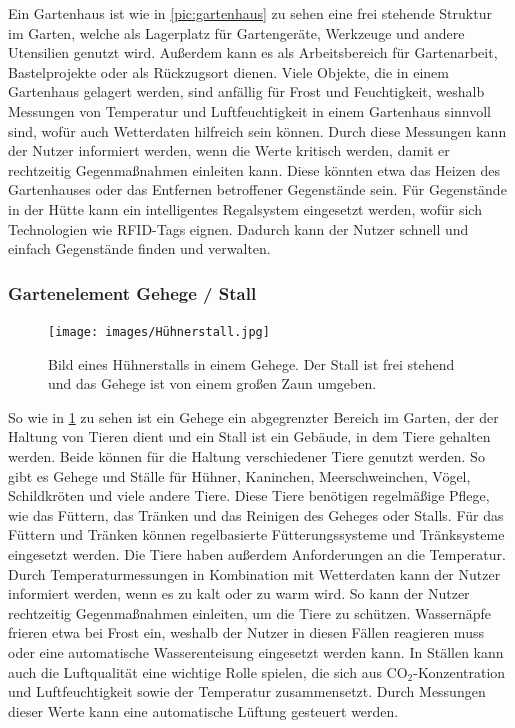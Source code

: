 
Ein Gartenhaus ist wie in \cref{pic:gartenhaus} zu sehen eine frei stehende Struktur im Garten, welche als Lagerplatz für Gartengeräte, Werkzeuge und andere Utensilien genutzt wird.
Außerdem kann es als Arbeitsbereich für Gartenarbeit, Bastelprojekte oder als Rückzugsort dienen.
Viele Objekte, die in einem Gartenhaus gelagert werden, sind anfällig für Frost und Feuchtigkeit, weshalb Messungen von Temperatur und Luftfeuchtigkeit in einem Gartenhaus sinnvoll sind, wofür auch Wetterdaten hilfreich sein können.
Durch diese Messungen kann der Nutzer informiert werden, wenn die Werte kritisch werden, damit er rechtzeitig Gegenmaßnahmen einleiten kann.
Diese könnten etwa das Heizen des Gartenhauses oder das Entfernen betroffener Gegenstände sein.
Für Gegenstände in der Hütte kann ein intelligentes Regalsystem eingesetzt werden, wofür sich Technologien wie RFID-Tags eignen.
Dadurch kann der Nutzer schnell und einfach Gegenstände finden und verwalten.

\subsubsection{Gartenelement Gehege / Stall}
\begin{figure}[!htb]
	\centering
	\texttt{[image: images/Hühnerstall.jpg]}
	\caption[Bild eines Hühnerstalls in einem Gehege.]{
		Bild eines Hühnerstalls in einem Gehege.
		Der Stall ist frei stehend und das Gehege ist von einem großen Zaun umgeben.\footnotemark
	}
	\label{pic:stall}
\end{figure}

So wie in \cref{pic:stall} zu sehen ist ein Gehege ein abgegrenzter Bereich im Garten, der der Haltung von Tieren dient und ein Stall ist ein Gebäude, in dem Tiere gehalten werden.
Beide können für die Haltung verschiedener Tiere genutzt werden.
So gibt es Gehege und Ställe für Hühner, Kaninchen, Meerschweinchen, Vögel, Schildkröten und viele andere Tiere.
Diese Tiere benötigen regelmäßige Pflege, wie das Füttern, das Tränken und das Reinigen des Geheges oder Stalls.
Für das Füttern und Tränken können regelbasierte Fütterungssysteme und Tränksysteme eingesetzt werden.
Die Tiere haben außerdem Anforderungen an die Temperatur.
Durch Temperaturmessungen in Kombination mit Wetterdaten kann der Nutzer informiert werden, wenn es zu kalt oder zu warm wird.
So kann der Nutzer rechtzeitig Gegenmaßnahmen einleiten, um die Tiere zu schützen.
Wassernäpfe frieren etwa bei Frost ein, weshalb der Nutzer in diesen Fällen reagieren muss oder eine automatische Wasserenteisung eingesetzt werden kann.
In Ställen kann auch die Luftqualität eine wichtige Rolle spielen, die sich aus CO$_2$-Konzentration und Luftfeuchtigkeit sowie der Temperatur zusammensetzt.
Durch Messungen dieser Werte kann eine automatische Lüftung gesteuert werden.

